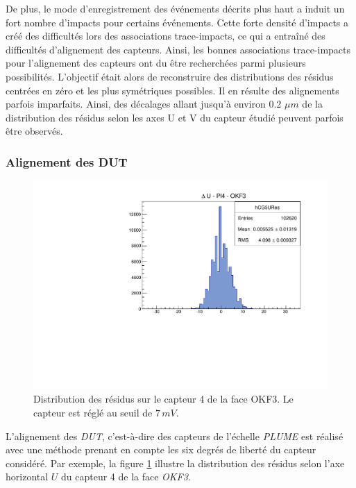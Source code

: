   \medskip
  
  De plus, le mode d'enregistrement des \'ev\'enements d\'ecrits plus haut a induit un fort nombre d'impacts pour certains \'ev\'enements. Cette forte densit\'e d'impacts a cr\'e\'e des difficult\'es lors des associations trace-impacts, ce qui a entraîn\'e des difficult\'es d'alignement des capteurs. Ainsi, les bonnes associations trace-impacts pour l'alignement des capteurs ont du \^etre recherch\'ees parmi plusieurs possibilit\'es. L'objectif \'etait alors de reconstruire des distributions des r\'esidus centr\'ees en z\'ero et les plus sym\'etriques possibles. Il en r\'esulte des alignements parfois imparfaits. Ainsi, des d\'ecalages allant jusqu'à environ 0.2 $\mu m$ de la distribution des r\'esidus selon les axes U et V du capteur \'etudi\'e peuvent parfois \^etre observ\'es.
  
  \subsubsection{Alignement des DUT}
   
   \begin{figure}[!htb]
    \begin{center} 
    \includegraphics[scale=0.5]{./figures/Plots_PLUME/Alignement/ResU_DUT_PL4_OKF3.pdf}
     \caption{Distribution des r\'esidus sur le capteur 4 de la face OKF3. Le capteur est r\'egl\'e au seuil de $7 \, mV$.}
     \label{fig:alignDUT_PLUME}    
     \end{center}
   \end{figure}

  L'alignement des \textit{DUT}, c'est-\`a-dire des capteurs de l'\'echelle \textit{PLUME} est r\'ealis\'e avec une m\'ethode prenant en compte les six degr\'es de libert\'e du capteur consid\'er\'e. Par exemple, la figure \ref{fig:alignDUT_PLUME} illustre la distribution des r\'esidus selon l'axe horizontal $U$ du capteur 4 de la face \textit{OKF3}.
   
